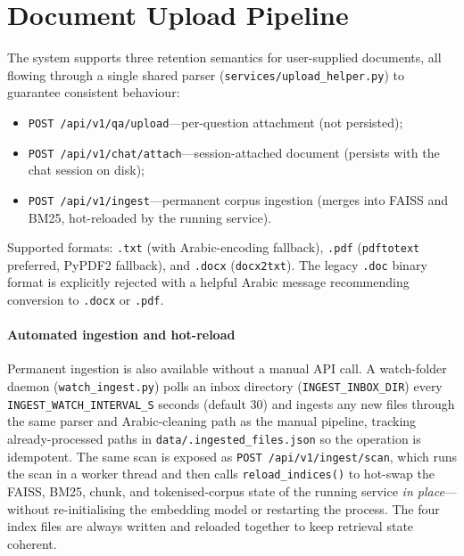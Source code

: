\documentclass[final,1p,times]{elsarticle}
\begin{document}
\section{Document Upload Pipeline}\label{sec:upload}

The system supports three retention semantics for user-supplied documents,
all flowing through a single shared parser (\texttt{services/upload\_helper.py})
to guarantee consistent behaviour:
\begin{itemize}
  \item \texttt{POST /api/v1/qa/upload}---per-question attachment (not
        persisted);
  \item \texttt{POST /api/v1/chat/attach}---session-attached document
        (persists with the chat session on disk);
  \item \texttt{POST /api/v1/ingest}---permanent corpus ingestion (merges
        into FAISS and BM25, hot-reloaded by the running service).
\end{itemize}

Supported formats: \texttt{.txt} (with Arabic-encoding fallback), \texttt{.pdf}
(\texttt{pdftotext} preferred, PyPDF2 fallback), and \texttt{.docx}
(\texttt{docx2txt}). The legacy \texttt{.doc} binary format is explicitly
rejected with a helpful Arabic message recommending conversion to
\texttt{.docx} or \texttt{.pdf}.

\paragraph{Automated ingestion and hot-reload} Permanent ingestion is also
available without a manual API call. A watch-folder daemon
(\texttt{watch\_ingest.py}) polls an inbox directory
(\texttt{INGEST\_INBOX\_DIR}) every \texttt{INGEST\_WATCH\_INTERVAL\_S} seconds
(default 30) and ingests any new files through the same parser and
Arabic-cleaning path as the manual pipeline, tracking already-processed paths
in \texttt{data/.ingested\_files.json} so the operation is idempotent. The
same scan is exposed as \texttt{POST /api/v1/ingest/scan}, which runs the scan
in a worker thread and then calls \texttt{reload\_indices()} to hot-swap the
FAISS, BM25, chunk, and tokenised-corpus state of the running service
\emph{in place}---without re-initialising the embedding model or restarting
the process. The four index files are always written and reloaded together to
keep retrieval state coherent.
\end{document}
